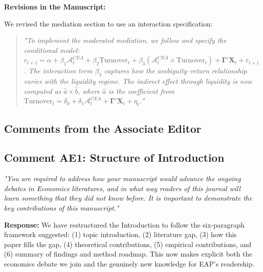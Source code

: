 \documentclass[12pt]{article}
\begin{document}
\begin{highlightbox}
\textbf{Revisions in the Manuscript:}

We revised the mediation section to use an interaction specification:
\vspace{0.2cm}
\begin{quote}
\itshape "To implement the moderated mediation, we follow \citet{preacher2007moderated} and specify the conditional model: $r_{t+1} = \alpha + \beta_1 \mathcal{A}^{CEA}_t + \beta_2 \text{Turnover}_t + \beta_3 (\mathcal{A}^{CEA}_t \times \text{Turnover}_t) + \mathbf{\Gamma}'\mathbf{X}_t + \varepsilon_{t+1}$. The interaction term $\beta_3$ captures how the ambiguity--return relationship varies with the liquidity regime. The indirect effect through liquidity is now computed as $\hat{a} \times \hat{b}$, where $\hat{a}$ is the coefficient from $\text{Turnover}_t = \delta_0 + \delta_1 \mathcal{A}^{CEA}_t + \mathbf{\Gamma}'\mathbf{X}_t + \eta_t$."
\end{quote}
\end{highlightbox}

\subsection*{Comments from the Associate Editor}

\subsection*{Comment AE1: Structure of Introduction}
\textit{"You are required to address how your manuscript would advance the ongoing debates in Economics literatures, and in what way readers of this journal will learn something that they did not know before. It is important to demonstrate the key contributions of this manuscript."}

\begin{highlightbox}
\textbf{Response:} We have restructured the Introduction to follow the six-paragraph framework suggested: (1) topic introduction, (2) literature gap, (3) how this paper fills the gap, (4) theoretical contributions, (5) empirical contributions, and (6) summary of findings and method roadmap. This now makes explicit both the economics debate we join and the genuinely new knowledge for EAP's readership.
\end{highlightbox}
\end{document}
